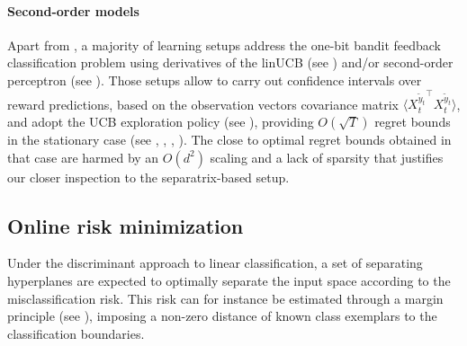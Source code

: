 \documentclass[preprint,12pt,authoryear]{elsarticle}
\begin{document}
\paragraph{Second-order models} 
Apart from \cite{kakade2008efficient}, a majority of learning setups address the one-bit bandit feedback classification problem using derivatives of the linUCB  (see \cite{auer2002using}) and/or second-order perceptron (see \cite{cesa2005second}). Those setups allow to carry out confidence intervals over reward predictions, based on the observation vectors covariance matrix $\langle{X_t^{\tilde{y}_t}}^\top {X_t^{\tilde{y}_t}}\rangle$, and adopt the UCB exploration policy (see \cite{lai1985asymptotically}), providing $O(\sqrt{T})$ regret bounds in the stationary case (see \cite{li2010contextual}, \cite{hazan2011newtron}, \cite{crammer2013multiclass}, \cite{ngo2013upper}).
The close to optimal regret bounds obtained in that case are harmed by an $O(d^2)$ scaling and a lack of sparsity that justifies our closer inspection to the separatrix-based setup.




\subsection{Online risk minimization}
Under the discriminant approach to linear classification, a set of separating hyperplanes are expected to optimally separate the input space according to the misclassification risk. This risk can for instance be estimated through a margin principle (see \cite{vapnik1998statistical}), imposing a non-zero distance of known class exemplars to the classification boundaries. 
\end{document}
